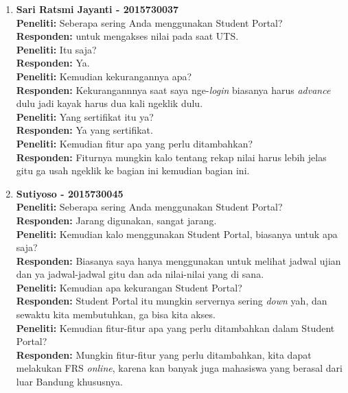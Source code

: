 \begin{enumerate}
	\item\textbf{Sari Ratsmi Jayanti - 2015730037}\\
	\textbf{Peneliti:} Seberapa sering Anda menggunakan Student Portal?\\
	\textbf{Responden:} untuk mengakses nilai pada saat UTS.\\
	\textbf{Peneliti:} Itu saja?\\
	\textbf{Responden:} Ya.\\
	\textbf{Peneliti:} Kemudian kekurangannya apa?\\
	\textbf{Responden:} Kekurangannnya saat saya nge-\textit{login} biasanya harus \textit{advance} dulu jadi kayak harus dua kali ngeklik dulu.\\
	\textbf{Peneliti:} Yang sertifikat itu ya?\\
	\textbf{Responden:} Ya yang sertifikat.\\
	\textbf{Peneliti:} Kemudian fitur apa yang perlu ditambahkan?\\
	\textbf{Responden:} Fiturnya mungkin kalo tentang rekap nilai harus lebih jelas gitu ga usah ngeklik ke bagian ini kemudian bagian ini.\\
	
	\item\textbf{Sutiyoso - 2015730045}\\
	\textbf{Peneliti:} Seberapa sering Anda menggunakan Student Portal?\\
	\textbf{Responden:} Jarang digunakan, sangat jarang.\\
	\textbf{Peneliti:} Kemudian kalo menggunakan Student Portal, biasanya untuk apa saja?\\
	\textbf{Responden:} Biasanya saya hanya menggunakan untuk melihat jadwal ujian dan ya jadwal-jadwal gitu dan ada nilai-nilai yang di sana.\\
	\textbf{Peneliti:} Kemudian apa kekurangan Student Portal?\\
	\textbf{Responden:} Student Portal itu mungkin servernya sering \textit{down} yah, dan sewaktu kita membutuhkan, ga bisa kita akses.\\
	\textbf{Peneliti:} Kemudian fitur-fitur apa yang perlu ditambahkan dalam Student Portal?\\
	\textbf{Responden:} Mungkin fitur-fitur yang perlu ditambahkan, kita dapat melakukan FRS \textit{online}, karena kan banyak juga mahasiswa yang berasal dari luar Bandung khususnya.\\
	

\end{enumerate}
